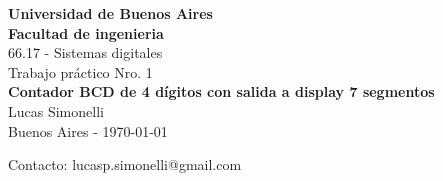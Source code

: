 \begin{center}

{\bf{\Huge Universidad de Buenos Aires}}\\[0.5cm]
{\bf{\Huge Facultad de ingenieria}}\\[0.3cm]

{\LARGE 66.17 - Sistemas digitales}\\[1.25cm]
{\Large }Trabajo práctico Nro. 1\\[2.3cm]
{\LARGE {\bf Contador BCD de 4 dígitos con salida a display 7 segmentos}}\\[3.5cm]
{\large Lucas Simonelli}\\[2cm]
Buenos Aires - \today
\\[5.2cm]

\end{center}

{Contacto: lucasp.simonelli@gmail.com}\\[2cm]
\thispagestyle{empty}   %